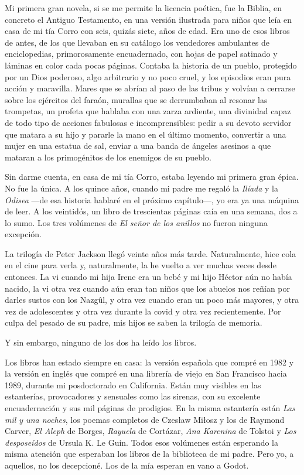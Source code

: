 Mi primera gran novela, si se me permite la licencia poética, fue la Biblia, en concreto el Antiguo Testamento, en una versión ilustrada para niños que leía en casa de mi tía Corro con seis, quizás siete, años de edad. Era uno de esos libros de antes, de los que llevaban en su catálogo los vendedores ambulantes de enciclopedias, primorosamente encuadernado, con hojas de papel satinado y láminas en color cada pocas páginas. Contaba la historia de un pueblo, protegido por un Dios poderoso, algo arbitrario y no poco cruel, y los episodios eran pura acción y maravilla. Mares que se abrían al paso de las tribus y volvían a cerrarse sobre los ejércitos del faraón, murallas que se derrumbaban al resonar las trompetas, un profeta que hablaba con una zarza ardiente, una divinidad capaz de todo tipo de acciones fabulosas e incomprensibles: pedir a su devoto servidor que matara a su hijo y pararle la mano en el último momento, convertir a una mujer en una estatua de sal, enviar a una banda de ángeles asesinos a que mataran a los primogénitos de los enemigos de su pueblo.

Sin darme cuenta, en casa de mi tía Corro, estaba leyendo mi primera gran épica. No fue la única. A los quince años, cuando mi padre me regaló la \emph{Ilíada} y la \emph{Odisea} ---de esa historia hablaré en el próximo capítulo---, yo era ya una máquina de leer. A los veintidós, un libro de trescientas páginas caía en una semana, dos a lo sumo. Los tres volúmenes de \emph{El señor de los anillos} no fueron ninguna excepción.

La trilogía de Peter Jackson llegó veinte años más tarde. Naturalmente, hice cola en el cine para verla y, naturalmente, la he vuelto a ver muchas veces desde entonces. La vi cuando mi hija Irene era un bebé y mi hijo Héctor aún no había nacido, la vi otra vez cuando aún eran tan niños que los abuelos nos reñían por darles sustos con los Nazgûl, y otra vez cuando eran un poco más mayores, y otra vez de adolescentes y otra vez durante la covid y otra vez recientemente. Por culpa del pesado de su padre, mis hijos se saben la trilogía de memoria.

Y sin embargo, ninguno de los dos ha leído los libros.

Los libros han estado siempre en casa: la versión española que compré en 1982 y la versión en inglés que compré en una librería de viejo en San Francisco hacia 1989, durante mi posdoctorado en California. Están muy visibles en las estanterías, provocadores y sensuales como las sirenas, con su excelente encuadernación y sus mil páginas de prodigios. En la misma estantería están \emph{Las mil y una noches}, los poemas completos de Czesław Miłosz y los de Raymond Carver, \emph{El Aleph} de Borges, \emph{Rayuela} de Cortázar, \emph{Ana Karenina} de Tolstoi y \emph{Los desposeídos} de Ursula K. Le Guin. Todos esos volúmenes están esperando la misma atención que esperaban los libros de la biblioteca de mi padre. Pero yo, a aquellos, no los decepcioné. Los de la mía esperan en vano a Godot.


